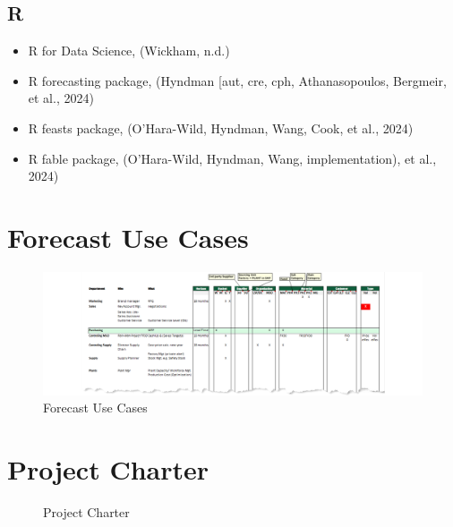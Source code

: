 \documentclass[
  american,
  10,
  a4paper,
]{book}
\providecommand{\tightlist}{%
  \setlength{\itemsep}{0pt}\setlength{\parskip}{0pt}}
\theoremstyle{definition}
\theoremstyle{remark}
\begin{document}
\subsection{R}\label{r}

\begin{itemize}
\tightlist
\item
  R for Data Science, (Wickham, n.d.)
\item
  R forecasting package, (Hyndman {[}aut, cre, cph, Athanasopoulos,
  Bergmeir, et al., 2024)
\item
  R feasts package, (O'Hara-Wild, Hyndman, Wang, Cook, et al., 2024)
\item
  R fable package, (O'Hara-Wild, Hyndman, Wang, implementation), et al.,
  2024)
\end{itemize}

\begin{landscape}

\section{Forecast Use Cases}\label{sec-forecast-use-cases}

\begin{figure}[H]

\caption{Forecast Use Cases}

{\centering \includegraphics[width=1\linewidth,height=\textheight,keepaspectratio]{nb/../images/forecast_use_cases.png}

}

\end{figure}%

\section{Project Charter}\label{sec-project-charter}

\begin{figure}[H]

\caption{Project Charter}


\end{figure}
\end{landscape}
\end{document}
